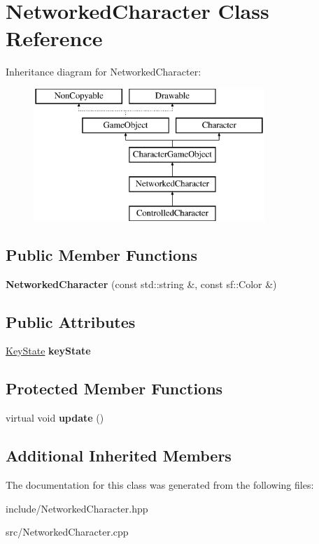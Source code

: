 \hypertarget{class_networked_character}{\section{Networked\-Character Class Reference}
\label{class_networked_character}
}
Inheritance diagram for Networked\-Character\-:\begin{figure}[H]
\begin{center}
\leavevmode
\includegraphics[height=5.000000cm]{class_networked_character}
\end{center}
\end{figure}
\subsection*{Public Member Functions}
\begin{DoxyCompactItemize}
\item 
\hypertarget{class_networked_character_a8186d89a0b00c184d66e9cbdee07a4f0}{{\bfseries Networked\-Character} (const std\-::string \&, const sf\-::\-Color \&)}\label{class_networked_character_a8186d89a0b00c184d66e9cbdee07a4f0}

\end{DoxyCompactItemize}
\subsection*{Public Attributes}
\begin{DoxyCompactItemize}
\item 
\hypertarget{class_networked_character_a459f88e77a2085a507507f7760408cf6}{\hyperlink{class_key_state}{Key\-State} {\bfseries key\-State}}\label{class_networked_character_a459f88e77a2085a507507f7760408cf6}

\end{DoxyCompactItemize}
\subsection*{Protected Member Functions}
\begin{DoxyCompactItemize}
\item 
\hypertarget{class_networked_character_af8a7f21f2195d8d789fa61ccca88ccfa}{virtual void {\bfseries update} ()}\label{class_networked_character_af8a7f21f2195d8d789fa61ccca88ccfa}

\end{DoxyCompactItemize}
\subsection*{Additional Inherited Members}


The documentation for this class was generated from the following files\-:\begin{DoxyCompactItemize}
\item 
include/Networked\-Character.\-hpp\item 
src/Networked\-Character.\-cpp\end{DoxyCompactItemize}
